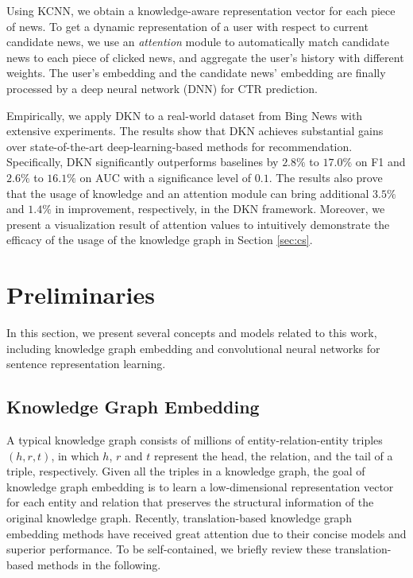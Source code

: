 \documentclass[sigconf]{acmart}
\begin{document}
	Using KCNN, we obtain a knowledge-aware representation vector for each piece of news.
	To get a dynamic representation of a user with respect to current candidate news, we use an \textit{attention} module to automatically match candidate news to each piece of clicked news, and aggregate the user's history with different weights.
	The user's embedding and the candidate news' embedding are finally processed by a deep neural network (DNN) for CTR prediction.
	
	Empirically, we apply DKN to a real-world dataset from Bing News with extensive experiments.
	The results show that DKN achieves substantial gains over state-of-the-art deep-learning-based methods for recommendation.
	Specifically, DKN significantly outperforms baselines by $2.8\%$ to $17.0\%$ on F1 and $2.6\%$ to $16.1\%$ on AUC with a significance level of $0.1$.
	The results also prove that the usage of knowledge and an attention module can bring additional $3.5\%$ and $1.4\%$ in improvement, respectively, in the DKN framework.
	Moreover, we present a visualization result of attention values to intuitively demonstrate the efficacy of the usage of the knowledge graph in Section \ref{sec:cs}.



\section{Preliminaries}
	In this section, we present several concepts and models related to this work, including knowledge graph embedding and convolutional neural networks for sentence representation learning.
	
	\subsection{Knowledge Graph Embedding}
	\label{sec:kge}
		A typical knowledge graph consists of millions of entity-relation-entity triples $(h, r, t)$, in which $h$, $r$ and $t$ represent the head, the relation, and the tail of a triple, respectively.
Given all the triples in a knowledge graph, the goal of knowledge graph embedding is to learn a low-dimensional representation vector for each entity and relation that preserves the structural information of the original knowledge graph.
		Recently, translation-based knowledge graph embedding methods have received great attention due to their concise models and superior performance.
		To be self-contained, we briefly review these translation-based methods in the following.
		
\end{document}
